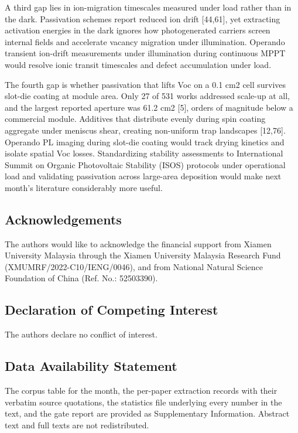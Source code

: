 \documentclass[
  11pt,
]{article}
\begin{document}
A third gap lies in ion-migration timescales measured under load rather
than in the dark. Passivation schemes report reduced ion drift
{[}44,61{]}, yet extracting activation energies in the dark ignores how
photogenerated carriers screen internal fields and accelerate vacancy
migration under illumination. Operando transient ion-drift measurements
under illumination during continuous MPPT would resolve ionic transit
timescales and defect accumulation under load.

The fourth gap is whether passivation that lifts Voc on a 0.1 cm2 cell
survives slot-die coating at module area. Only 27 of 531 works addressed
scale-up at all, and the largest reported aperture was 61.2 cm2 {[}5{]},
orders of magnitude below a commercial module. Additives that distribute
evenly during spin coating aggregate under meniscus shear, creating
non-uniform trap landscapes {[}12,76{]}. Operando PL imaging during
slot-die coating would track drying kinetics and isolate spatial Voc
losses. Standardizing stability assessments to International Summit on
Organic Photovoltaic Stability (ISOS) protocols under operational load
and validating passivation across large-area deposition would make next
month's literature considerably more useful.

\subsection{Acknowledgements}\label{acknowledgements}

The authors would like to acknowledge the financial support from Xiamen
University Malaysia through the Xiamen University Malaysia Research Fund
(XMUMRF/2022-C10/IENG/0046), and from National Natural Science
Foundation of China (Ref. No.: 52503390).

\subsection{Declaration of Competing
Interest}\label{declaration-of-competing-interest}

The authors declare no conflict of interest.

\subsection{Data Availability
Statement}\label{data-availability-statement}

The corpus table for the month, the per-paper extraction records with
their verbatim source quotations, the statistics file underlying every
number in the text, and the gate report are provided as Supplementary
Information. Abstract text and full texts are not redistributed.
\end{document}
